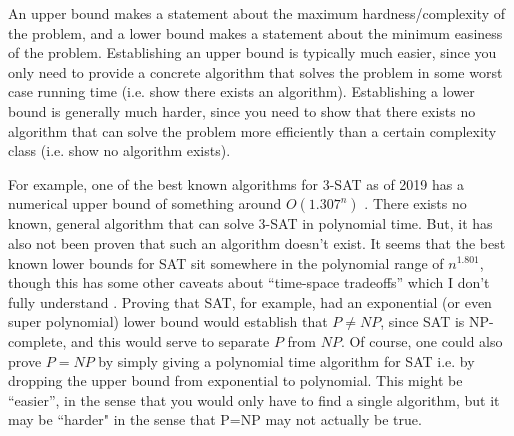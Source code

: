 \documentclass[10pt,a4paper]{article}
\begin{document}
An upper bound makes a statement about the maximum hardness/complexity of the problem, and a lower bound makes a statement about the minimum easiness of the problem. Establishing an upper bound is typically much easier, since you only need to provide a concrete algorithm that solves the problem in some worst case running time (i.e. show there exists an algorithm). Establishing a lower bound is generally much harder, since you need to show that there exists no algorithm that can solve the problem more efficiently than a certain complexity class (i.e. show no algorithm exists). 

For example, one of the best known algorithms for 3-SAT as of 2019 has a numerical upper bound of something around $O(1.307^n)$ \cite{2019fasterkSAT}. There exists no known, general algorithm that can solve 3-SAT in polynomial time. But, it has also not been proven that such an algorithm doesn't exist. It seems that the best known lower bounds for SAT sit somewhere in the polynomial range of $n^{1.801}$, though this has some other caveats about ``time-space tradeoffs'' which I don't fully understand \cite{SE3satlowerbounds}. Proving that SAT, for example, had an exponential (or even super polynomial) lower bound would establish that $P \neq NP$, since SAT is NP-complete, and this would serve to separate $P$ from $NP$. Of course, one could also prove $P=NP$ by simply giving a polynomial time algorithm for SAT i.e. by dropping the upper bound from exponential to polynomial. This might be ``easier'', in the sense that you would only have to find a single algorithm, but it may be ``harder" in the sense that P=NP may not actually be true.







\end{document}
